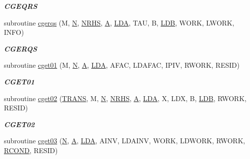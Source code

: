\begin{DoxyCompactItemize}
\begin{DoxyCompactList}\small\item\em {\bfseries C\+G\+E\+Q\+R\+S} \end{DoxyCompactList}\item 
subroutine \hyperlink{group__complex__lin_gaa7bab7c459738ac66315d480a943b138}{cgerqs} (M, \hyperlink{polmisc_8c_a0240ac851181b84ac374872dc5434ee4}{N}, \hyperlink{example__user_8c_aa0138da002ce2a90360df2f521eb3198}{N\+R\+H\+S}, \hyperlink{classA}{A}, \hyperlink{example__user_8c_ae946da542ce0db94dced19b2ecefd1aa}{L\+D\+A}, T\+A\+U, B, \hyperlink{example__user_8c_a50e90a7104df172b5a89a06c47fcca04}{L\+D\+B}, W\+O\+R\+K, L\+W\+O\+R\+K, I\+N\+F\+O)
\begin{DoxyCompactList}\small\item\em {\bfseries C\+G\+E\+R\+Q\+S} \end{DoxyCompactList}\item 
subroutine \hyperlink{group__complex__lin_ga03ee60a57ec9e14a15595e6556d780cd}{cget01} (M, \hyperlink{polmisc_8c_a0240ac851181b84ac374872dc5434ee4}{N}, \hyperlink{classA}{A}, \hyperlink{example__user_8c_ae946da542ce0db94dced19b2ecefd1aa}{L\+D\+A}, A\+F\+A\+C, L\+D\+A\+F\+A\+C, I\+P\+I\+V, R\+W\+O\+R\+K, R\+E\+S\+I\+D)
\begin{DoxyCompactList}\small\item\em {\bfseries C\+G\+E\+T01} \end{DoxyCompactList}\item 
subroutine \hyperlink{group__complex__lin_gab6d2226b2f8806aa9b110c167c93bedf}{cget02} (\hyperlink{superlu__enum__consts_8h_a0c4e17b2d5cea33f9991ccc6a6678d62a1f61e3015bfe0f0c2c3fda4c5a0cdf58}{T\+R\+A\+N\+S}, M, \hyperlink{polmisc_8c_a0240ac851181b84ac374872dc5434ee4}{N}, \hyperlink{example__user_8c_aa0138da002ce2a90360df2f521eb3198}{N\+R\+H\+S}, \hyperlink{classA}{A}, \hyperlink{example__user_8c_ae946da542ce0db94dced19b2ecefd1aa}{L\+D\+A}, X, L\+D\+X, B, \hyperlink{example__user_8c_a50e90a7104df172b5a89a06c47fcca04}{L\+D\+B}, R\+W\+O\+R\+K, R\+E\+S\+I\+D)
\begin{DoxyCompactList}\small\item\em {\bfseries C\+G\+E\+T02} \end{DoxyCompactList}\item 
subroutine \hyperlink{group__complex__lin_ga397ab1bdda904c62d76bc46e9ee3ed41}{cget03} (\hyperlink{polmisc_8c_a0240ac851181b84ac374872dc5434ee4}{N}, \hyperlink{classA}{A}, \hyperlink{example__user_8c_ae946da542ce0db94dced19b2ecefd1aa}{L\+D\+A}, A\+I\+N\+V, L\+D\+A\+I\+N\+V, W\+O\+R\+K, L\+D\+W\+O\+R\+K, R\+W\+O\+R\+K, \hyperlink{superlu__enum__consts_8h_af00a42ecad444bbda75cde1b64bd7e72a9b5c151728d8512307565994c89919d5}{R\+C\+O\+N\+D}, R\+E\+S\+I\+D)

\end{DoxyCompactItemize}
